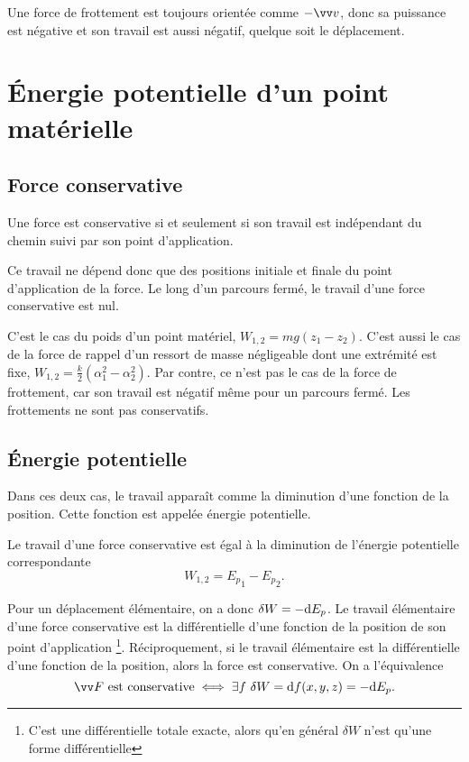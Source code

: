 Une force de frottement est toujours orientée comme \(-\vvv\), donc sa puissance est négative et son travail est aussi négatif, quelque soit le déplacement.

\section{Énergie potentielle d'un point matérielle}
\label{chap4-sec:energiepotentielle}
\subsection{Force conservative}
\label{chap4-subsec:forceconservative}
\begin{defdef}
  Une force est conservative si et seulement si son travail est indépendant du chemin suivi par son point d'application.
\end{defdef}

Ce travail ne dépend donc que des positions initiale et finale du point d'application de la force. Le long d'un parcours fermé, le travail d'une force conservative est nul.

C'est le cas du poids d'un point matériel, \(W_{1,2}=mg(z_1-z_2)\). C'est aussi le cas de la force de rappel d'un ressort de masse négligeable dont une extrémité est fixe, \(W_{1, 2} = \frac{k}{2}(\alpha_1^2 - \alpha_2^2)\). Par contre, ce n'est pas le cas de la force de frottement, car son travail est négatif même pour un parcours fermé. Les frottements ne sont pas conservatifs.

\subsection{Énergie potentielle}
\label{chap4-subsec:energiepotentielle}

Dans ces deux cas, le travail apparaît comme la diminution d'une fonction de la position. Cette fonction est appelée énergie potentielle.
\begin{defdef}
  Le travail d'une force conservative est égal à la diminution de l'énergie potentielle correspondante
  \begin{equation}
    W_{1, 2}={E_p}_1 -{E_p}_2.
  \end{equation}
\end{defdef}
Pour un déplacement élémentaire, on a donc \(\delta W = -\mathrm{d} E_p\). Le travail élémentaire d'une force conservative est la différentielle d'une fonction de la position de son point d'application \footnote{C'est une différentielle totale exacte, alors qu'en général \(\delta W\) n'est qu'une forme différentielle}. Réciproquement, si le travail élémentaire est la différentielle d'une fonction de la position, alors la force est conservative. On a l'équivalence
\begin{equation}
  \vF \text{~est conservative} \iff \exists f \ \delta W = \D f(x,y,z) = -\D E_p.
\end{equation}

